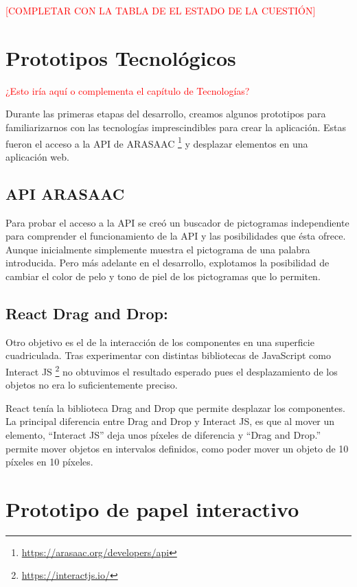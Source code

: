 \textcolor{red}{[COMPLETAR CON LA TABLA DE EL ESTADO DE LA CUESTIÓN]}




\section{Prototipos Tecnológicos}
\textcolor{red}{¿Esto iría aquí o complementa el capítulo de Tecnologías?}

Durante las primeras etapas del desarrollo, creamos algunos prototipos para familiarizarnos con las tecnologías imprescindibles para crear la aplicación. Estas fueron el acceso a la API de ARASAAC \footnote{\url{https://arasaac.org/developers/api}} y desplazar elementos en una aplicación web.

\subsection{API ARASAAC}

Para probar el acceso a la API se creó un buscador de pictogramas independiente para comprender el funcionamiento de la API y las posibilidades que ésta ofrece. Aunque inicialmente simplemente muestra el pictograma de una palabra introducida. Pero más adelante en el desarrollo, explotamos la posibilidad de cambiar el color de pelo y tono de piel de los pictogramas que lo permiten.


\subsection{React Drag and Drop:}

Otro objetivo es el de la interacción de los componentes en una superficie cuadriculada. Tras experimentar con distintas bibliotecas de JavaScript como Interact JS \footnote{\url{https://interactjs.io/}} no obtuvimos el resultado esperado pues el desplazamiento de los objetos no era lo suficientemente preciso.

React tenía la biblioteca Drag and Drop que permite desplazar los componentes. La principal diferencia entre Drag and Drop y Interact JS, es que al mover un elemento, “Interact JS”  deja unos píxeles de diferencia y “Drag and Drop.” permite mover objetos en intervalos definidos, como poder mover un objeto de 10 píxeles en 10 píxeles.


\section{Prototipo de papel interactivo}

